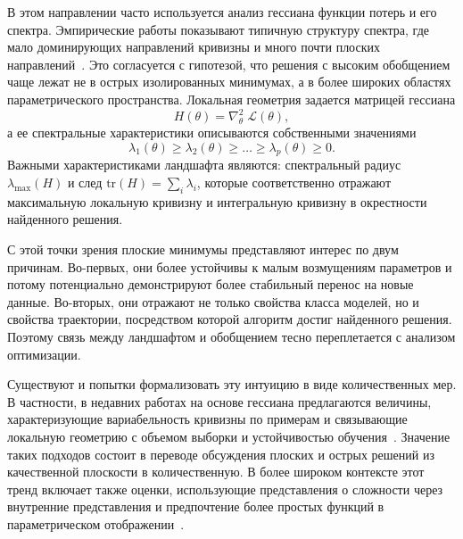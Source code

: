 \documentclass[russian]{intsys}
\begin{document}
В этом направлении часто используется анализ гессиана функции потерь и его спектра.
Эмпирические работы показывают типичную структуру спектра, где мало доминирующих направлений кривизны и много почти плоских направлений~\cite{sagun2017eigenvalues,hessian2019sgd,hessianpowerlaw2022}.
Это согласуется с гипотезой, что решения с высоким обобщением чаще лежат не в острых изолированных минимумах, а в более широких областях параметрического пространства.
Локальная геометрия задается матрицей гессиана
\begin{equation}
H(\theta)=\nabla^2_{\theta}\;\mathcal L(\theta),
\label{eq:hessian_def}
\end{equation}
а ее спектральные характеристики описываются собственными значениями
\begin{equation}
\lambda_1(\theta)\ge \lambda_2(\theta)\ge \dots \ge \lambda_p(\theta)\ge 0.
\label{eq:hessian_spectrum}
\end{equation}
Важными характеристиками ландшафта являются: спектральный радиус $\lambda_{\max}(H)$ и след $\mathrm{tr}(H)=\sum_i \lambda_i$, которые соответственно отражают максимальную локальную кривизну и интегральную кривизну в окрестности найденного решения.

С этой точки зрения плоские минимумы представляют интерес по двум причинам.
Во-первых, они более устойчивы к малым возмущениям параметров и потому потенциально демонстрируют более стабильный перенос на новые данные.
Во-вторых, они отражают не только свойства класса моделей, но и свойства траектории, посредством которой алгоритм достиг найденного решения.
Поэтому связь между ландшафтом и обобщением тесно переплетается с анализом оптимизации.

Существуют и попытки формализовать эту интуицию в виде количественных мер.
В частности, в недавних работах на основе гессиана предлагаются величины, характеризующие вариабельность кривизны по примерам и связывающие локальную геометрию с объемом выборки и устойчивостью обучения~\cite{kiselev2024unraveling}.
Значение таких подходов состоит в переводе обсуждения плоских и острых решений из качественной плоскости в количественную.
В более широком контексте этот тренд включает также оценки, использующие представления о сложности через внутренние представления и предпочтение более простых функций в параметрическом отображении~\cite{representation2020complexity,simplicitybias2018}.
\end{document}
